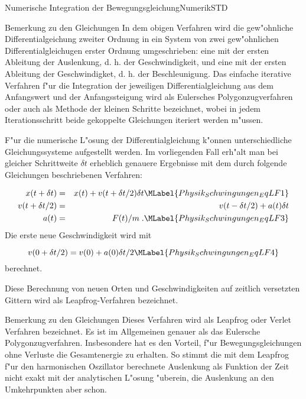 \begin{MXContent}{Numerische Integration der Bewegungsgleichung}{Numerik}{STD}
  \begin{MHint}{Bemerkung zu den Gleichungen}
  In dem obigen Verfahren wird die gew"ohnliche Differentialgeichung zweiter Ordnung in ein System von zwei gew"ohnlichen Differentialgleichugen erster Ordnung umgeschrieben: eine mit der ersten Ableitung der Auslenkung, d. h. der Geschwindigkeit, und eine mit der ersten Ableitung der Geschwindigket, d. h. der Beschleunigung. Das einfache iterative Verfahren f"ur die Integration der jeweiligen Differentialgleichung aus dem Anfangswert und der Anfangssteigung wird als Eulersches Polygonzugverfahren oder auch als Methode der kleinen Schritte bezeichnet, wobei in jedem Iterationsschritt beide gekoppelte Gleichungen iteriert werden m"ussen.
  \end{MHint}

\begin{MInfo}
F"ur die numerische L"osung der Differentialgleichung k"onnen unterschiedliche Gleichungssysteme aufgestellt werden. Im vorliegenden Fall erh"alt man bei gleicher Schrittweite $\delta t$ erheblich genauere Ergebnisse mit dem durch folgende Gleichungen beschriebenen Verfahren:

\begin{eqnarray}
  x(t+\delta t) &=& x(t) + v(t+\delta t / 2) \delta t  \MLabel{Physik_Schwingungen_EqLF1}\\
  v(t+\delta t / 2) &=& v(t-\delta t / 2) + a(t) \delta t\\
  a(t) &=& F(t)/m\; .\MLabel{Physik_Schwingungen_EqLF3}
\end{eqnarray}
Die erste neue Geschwindigkeit wird mit 

\begin{equation}
  v(0+\delta t / 2) = v(0) + a(0)\delta t / 2\MLabel{Physik_Schwingungen_EqLF4}
\end{equation} 
berechnet.

Diese Berechnung von neuen Orten und Geschwindigkeiten auf zeitlich versetzten Gittern wird als Leapfrog-Verfahren bezeichnet.

\end{MInfo}

  \begin{MHint}{Bemerkung zu den Gleichungen}
  Dieses Verfahren wird als Leapfrog oder Verlet Verfahren bezeichnet. Es ist im Allgemeinen genauer als das Eulersche Polygonzugverfahren. Insbesondere hat es den Vorteil, f"ur Bewegungsgleichungen ohne Verluste die Gesamtenergie zu erhalten. So stimmt die mit dem Leapfrog f"ur den harmonischen Oszillator berechnete Auslenkung als Funktion der Zeit nicht exakt mit der analytischen L"osung "uberein, die Auslenkung an den Umkehrpunkten aber schon.
  \end{MHint}




\end{MXContent}
